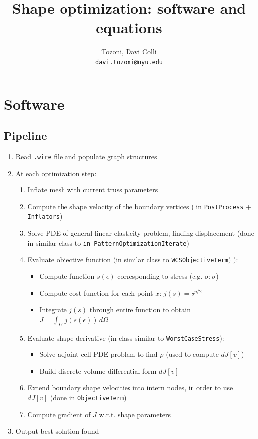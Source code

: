 \documentclass[11pt]{article}
\author{
  Tozoni, Davi Colli\\
  \texttt{davi.tozoni@nyu.edu}
}
\title{Shape optimization: software and equations}
\begin{document}
\maketitle

\section{Software}

\subsection{Pipeline}

\begin{enumerate}
  \item Read \texttt{.wire} file and populate graph structures
  \item At each optimization step:
    \begin{enumerate}
      \item Inflate mesh with current truss parameters
      \item Compute the shape velocity of the boundary vertices ( in \texttt{PostProcess} + \texttt{Inflators})
      \item Solve PDE of general linear elasticity problem, finding displacement (done in similar class to \texttt{in PatternOptimizationIterate})
      \item Evaluate objective function (in similar class to \texttt{WCSObjectiveTerm})
):
        \begin{itemize}
          \item Compute function $s(\epsilon)$ corresponding to stress (e.g. $\sigma:\sigma$)           \item Compute cost function for each point $x$: $j(s) = s^{p/2}$
          \item Integrate $j(s)$ through entire function to obtain $J = \int_\Omega\, j(s(\epsilon))\, d\Omega$
        \end{itemize}
      \item Evaluate shape derivative (in class similar to \texttt{WorstCaseStress}):
        \begin{itemize}
          \item Solve adjoint cell PDE problem to find $\rho$ (used to compute $dJ[v]$)
          \item Build discrete volume differential form $dJ[v]$ 
        \end{itemize}
      \item Extend boundary shape velocities into intern nodes, in order to use $dJ[v]$ (done in \texttt{ObjectiveTerm})
      \item Compute gradient of $J$ w.r.t. shape parameters
    \end{enumerate}
    \item Output best solution found
\end{enumerate}
\end{document}
